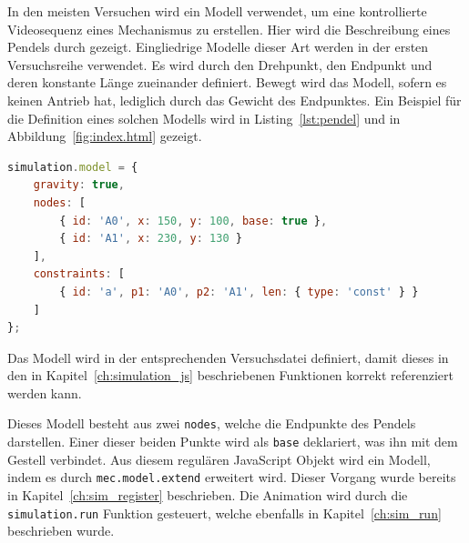 In den meisten Versuchen wird ein  Modell verwendet, um eine kontrollierte Videosequenz eines Mechanismus zu erstellen.
Hier wird die Beschreibung eines Pendels durch  gezeigt.
Eingliedrige Modelle dieser Art werden in der ersten Versuchsreihe verwendet.
Es wird durch den Drehpunkt, den Endpunkt und deren konstante Länge zueinander definiert.
Bewegt wird das Modell, sofern es keinen Antrieb hat, lediglich durch das Gewicht des Endpunktes.
Ein Beispiel für die Definition eines solchen Modells wird in Listing~\ref{lst:pendel} und in Abbildung~\ref{fig:index.html} gezeigt.

\begin{lstlisting}[language=JavaScript, caption={Definition eines Pendels in \name{mec2} inklusive Animation.}, label={lst:pendel}]
simulation.model = {
    gravity: true,
    nodes: [
        { id: 'A0', x: 150, y: 100, base: true },
        { id: 'A1', x: 230, y: 130 }
    ],
    constraints: [
        { id: 'a', p1: 'A0', p2: 'A1', len: { type: 'const' } }
    ]
};
\end{lstlisting}

Das  Modell wird in der entsprechenden Versuchsdatei definiert, damit dieses in den in Kapitel~\ref{ch:simulation_js} beschriebenen Funktionen korrekt referenziert werden kann.

Dieses Modell besteht aus zwei \lstinline{nodes}, welche die Endpunkte des Pendels darstellen.
Einer dieser beiden Punkte wird als \lstinline{base} deklariert, was ihn mit dem Gestell verbindet.
Aus diesem regulären JavaScript Objekt wird ein  Modell, indem es durch \lstinline{mec.model.extend} erweitert wird.
Dieser Vorgang wurde bereits in Kapitel~\ref{ch:sim_register} beschrieben.
Die Animation wird durch die \lstinline{simulation.run} Funktion gesteuert, welche ebenfalls in Kapitel~\ref{ch:sim_run} beschrieben wurde.